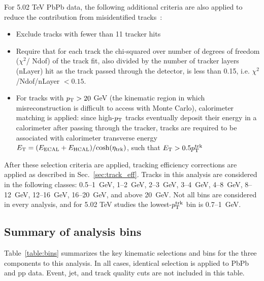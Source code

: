 \noindent For 5.02 TeV PbPb data, the following additional criteria are also applied to reduce the contribution from misidentified tracks~\cite{AN-15-187}:
\begin{itemize}
\item Exclude tracks with fewer than 11 tracker hits
\item Require that for each track the chi-squared over number of degrees of freedom ($\chi^{2}$/ Ndof) of the track fit, also divided by the number of tracker layers (nLayer) hit as the track passed through the detector, is less than 0.15, i.e. $\chi^{2}$/Ndof/nLayer $< 0.15$.  
\item For tracks with $p_{\rm T} > 20$ GeV (the kinematic region in which misreconstruction is difficult to access with Monte Carlo), calorimeter matching is applied:  since high-$p_{\rm T}$ tracks eventually deposit their energy in a calorimeter after passing through the tracker, tracks are required to be associated with calorimeter transverse energy $E_{\rm T} = (E_{\rm ECAL} + E_{\rm HCAL})/\rm{cosh}(\eta_{\rm trk})$, such that $E_{\rm T} > 0.5 p_{\rm T}^{\rm trk}$ 

\end{itemize}

\noindent After these selection criteria are applied, tracking efficiency corrections are applied as described in Sec.~\ref{sec:track_eff}.  Tracks in this analysis are considered in the following classes:  0.5--1~GeV, 1--2~GeV, 2--3~GeV, 3--4~GeV, 4--8~GeV, 8--12~GeV, 12--16~GeV, 16--20~GeV, and above 20~GeV.   Not all bins are considered in every analysis, and for 5.02 TeV studies the lowest-$p_{\rm T}^{\rm trk}$ bin is 0.7--1~GeV.     

\clearpage

\subsection{Summary of analysis bins}

Table~\ref{table:bins} summarizes the key kinematic selections and bins for the three components to this analysis.  In all cases, identical selection is applied to PbPb and pp data.  Event, jet, and track quality cuts are not included in this table.

